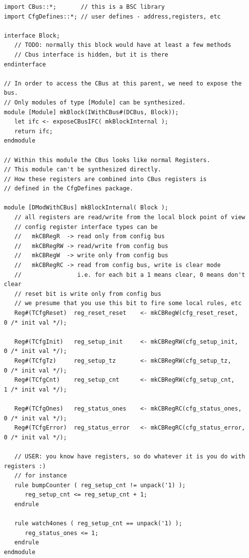 \begin{verbatim}
import CBus::*;       // this is a BSC library
import CfgDefines::*; // user defines - address,registers, etc

interface Block;
   // TODO: normally this block would have at least a few methods
   // Cbus interface is hidden, but it is there
endinterface

// In order to access the CBus at this parent, we need to expose the bus.   
// Only modules of type [Module] can be synthesized.
module [Module] mkBlock(IWithCBus#(DCBus, Block));
   let ifc <- exposeCBusIFC( mkBlockInternal );
   return ifc;
endmodule

// Within this module the CBus looks like normal Registers.
// This module can't be synthesized directly.
// How these registers are combined into CBus registers is 
// defined in the CfgDefines package.

module [DModWithCBus] mkBlockInternal( Block );
   // all registers are read/write from the local block point of view
   // config register interface types can be
   //   mkCBRegR  -> read only from config bus
   //   mkCBRegRW -> read/write from config bus
   //   mkCBRegW  -> write only from config bus
   //   mkCBRegRC -> read from config bus, write is clear mode
   //                i.e. for each bit a 1 means clear, 0 means don't clear
   // reset bit is write only from config bus
   // we presume that you use this bit to fire some local rules, etc
   Reg#(TCfgReset)  reg_reset_reset    <- mkCBRegW(cfg_reset_reset,    0 /* init val */);

   Reg#(TCfgInit)   reg_setup_init     <- mkCBRegRW(cfg_setup_init,    0 /* init val */);
   Reg#(TCfgTz)     reg_setup_tz       <- mkCBRegRW(cfg_setup_tz,      0 /* init val */);
   Reg#(TCfgCnt)    reg_setup_cnt      <- mkCBRegRW(cfg_setup_cnt,     1 /* init val */);

   Reg#(TCfgOnes)   reg_status_ones    <- mkCBRegRC(cfg_status_ones,   0 /* init val */);
   Reg#(TCfgError)  reg_status_error   <- mkCBRegRC(cfg_status_error,  0 /* init val */);

   // USER: you know have registers, so do whatever it is you do with registers :)
   // for instance
   rule bumpCounter ( reg_setup_cnt != unpack('1) );
      reg_setup_cnt <= reg_setup_cnt + 1;
   endrule

   rule watch4ones ( reg_setup_cnt == unpack('1) );
      reg_status_ones <= 1;
   endrule
endmodule
\end{verbatim}


